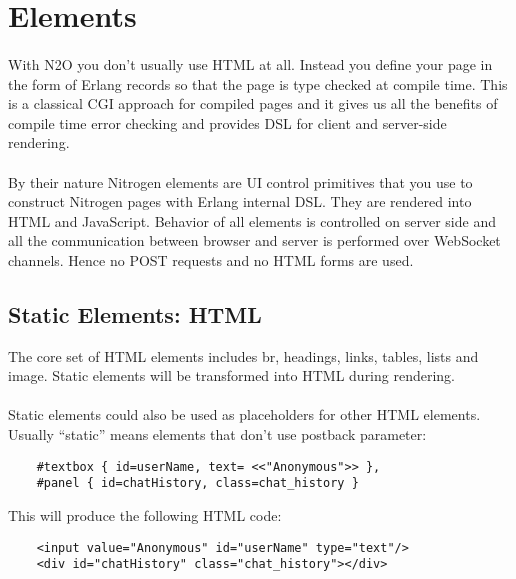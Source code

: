 \section{Elements}

\paragraph{}
With N2O you don't usually use HTML at all. Instead you define your page
in the form of Erlang records so that the page is type checked at compile time.
This is a classical CGI approach for compiled pages and it gives us all the benefits of
compile time error checking and provides DSL for client and server-side rendering.

\paragraph{}
By their nature Nitrogen elements are UI control primitives
that you use to construct Nitrogen pages with Erlang internal DSL.
They are rendered into HTML and JavaScript.
Behavior of all elements is controlled on server side and all the communication
between browser and server is performed over WebSocket channels.
Hence no POST requests and no HTML forms are used.

\subsection{Static Elements: HTML}
The core set of HTML elements includes br, headings, links, tables, lists and image.
Static elements will be transformed into HTML during rendering.

\paragraph{}
Static elements could also be used as placeholders for other HTML elements.
Usually ``static'' means elements that don't use postback parameter:

\vspace{1\baselineskip}
\begin{lstlisting}
    #textbox { id=userName, text= <<"Anonymous">> },
    #panel { id=chatHistory, class=chat_history }
\end{lstlisting}
\vspace{1\baselineskip}

This will produce the following HTML code:
\vspace{1\baselineskip}
\begin{lstlisting}
    <input value="Anonymous" id="userName" type="text"/>
    <div id="chatHistory" class="chat_history"></div>
\end{lstlisting}

